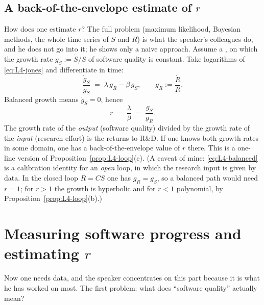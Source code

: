 \subsection{A back-of-the-envelope estimate of $r$}\label{sec:L4-balanced}
How does one estimate $r$? The full problem (maximum likelihood, Bayesian methods, the whole time series of $S$ and $R$) is what the speaker's colleagues do, and he does not go into it; he shows only a naive approach. Assume a , on which the growth rate $g_S:=\dot S/S$ of software quality is constant. Take logarithms of \eqref{eq:L4-jones} and differentiate in time:
\[
   \frac{\dot g_S}{g_S}\;=\;\lambda\,g_R-\beta\,g_S,\qquad g_R:=\frac{\dot R}{R}.
\]
Balanced growth means $\dot g_S=0$, hence
\begin{equation}\label{eq:L4-balanced}
   r\;=\;\frac{\lambda}{\beta}\;=\;\frac{g_S}{g_R}.
\end{equation}
The growth rate of the \emph{output} (software quality) divided by the growth rate of the \emph{input} (research effort) is the returns to R\&D. If one knows both growth rates in some domain, one has a back-of-the-envelope value of $r$ there. This is a one-line version of Proposition~\ref{prop:L4-loop}(c). (A caveat of mine: \eqref{eq:L4-balanced} is a calibration identity for an \emph{open} loop, in which the research input is given by data. In the closed loop $R=CS$ one has $g_R=g_S$, so a balanced path would need $r=1$; for $r>1$ the growth is hyperbolic and for $r<1$ polynomial, by Proposition~\ref{prop:L4-loop}(b).)

\section{Measuring software progress and estimating $r$}\label{sec:L4-measure}
Now one needs data, and the speaker concentrates on this part because it is what he has worked on most. The first problem: what does ``software quality'' actually mean?

